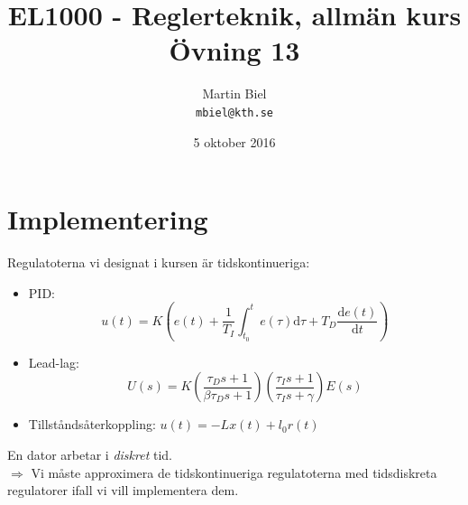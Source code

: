 \documentclass[12pt]{article}
\newcommand{\de}[1]{\mathrm{d} #1}
\begin{document}
\begin{titlepage}
\author{Martin Biel \\ \texttt{mbiel@kth.se}}
\title{EL1000 - Reglerteknik, allmän kurs \\ \Large Övning 13}
\date{5 oktober 2016}
\end{titlepage}

\maketitle

\section*{Implementering}
Regulatoterna vi designat i kursen är tidskontinueriga:
\begin{itemize}
\item PID: 
\[u(t) = K \left( e(t) + \dfrac{1}{T_I} \int_{t_0}^{t}e(\tau) \de{\tau} + T_D \dfrac{\de{e(t)}}{\de{t}} \right)\]
\item Lead-lag: 
\[U(s) = K \left( \dfrac{\tau_Ds+1}{\beta \tau_D s + 1} \right) \left( \dfrac{\tau_Is+1}{\tau_I s+\gamma} \right) E(s)\]
\item Tillståndsåterkoppling: $u(t) = -Lx(t)+l_0r(t)$
\end{itemize}
En dator arbetar i \emph{diskret} tid. \\
$\Rightarrow$ Vi måste approximera de tidskontinueriga regulatoterna med tidsdiskreta regulatorer ifall vi vill implementera dem. \\
\end{document}
